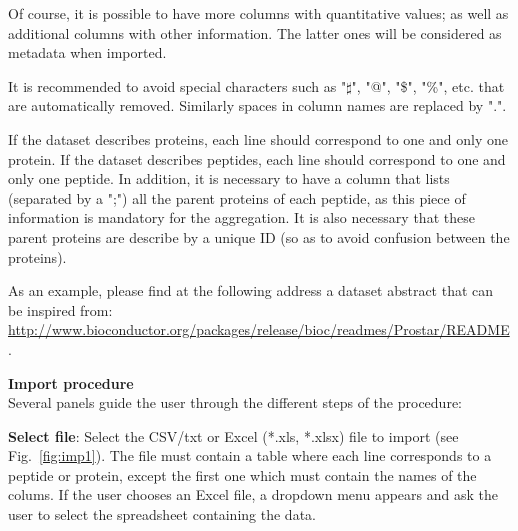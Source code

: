 \documentclass[12pt]{article}
\begin{document}
Of course, it is possible to have more columns with quantitative values; as well as additional columns with other information. The latter ones will be considered as metadata when imported.

It is recommended to avoid special characters such as "$\sharp$", "@", "\$", "\%", etc. that are automatically removed. Similarly spaces in column names are replaced by ".".

If the dataset describes proteins, each line should correspond to one and only one protein. 
If the dataset describes peptides, each line should correspond to one and only one peptide. In addition, it is necessary to have a column that lists (separated by a ";") all the parent proteins of each peptide, as this piece of information is mandatory for the aggregation. It is also necessary that these parent proteins are describe by a unique ID (so as to avoid confusion between the proteins).

As an example, please find at the following address a dataset abstract that can be inspired from: \url{http://www.bioconductor.org/packages/release/bioc/readmes/Prostar/README}. 


\noindent \textbf{Import procedure}\\
\noindent Several panels guide the user through the different steps of the procedure:

\textbf {Select file}: Select the CSV/txt or Excel (*.xls, *.xlsx) file to import (see 
Fig.~\ref{fig:imp1}). The file must contain a table where each line 
corresponds to a peptide or protein, except the first one which must contain 
the names of the colums. 
If the user chooses an Excel file, a dropdown menu appears and ask the user to 
select the spreadsheet containing the data. 
\end{document}
